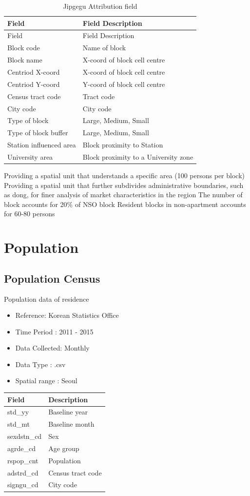 \documentclass[]{book}
\providecommand{\tightlist}{%
  \setlength{\itemsep}{0pt}\setlength{\parskip}{0pt}}
\theoremstyle{definition}
\theoremstyle{definition}
\theoremstyle{definition}
\theoremstyle{remark}
\begin{document}
\begin{longtable}[]{@{}ll@{}}
\caption{\label{tab:foo} Jipgegu Attribution field}\tabularnewline
\toprule
Field & Field Description\tabularnewline
\midrule
\endfirsthead
\toprule
Field & Field Description\tabularnewline
\midrule
\endhead
Block code & Name of block\tabularnewline
Block name & X-coord of block cell centre\tabularnewline
Centriod X-coord & X-coord of block cell centre\tabularnewline
Centriod Y-coord & Y-coord of block cell centre\tabularnewline
Census tract code & Tract code\tabularnewline
City code & City code\tabularnewline
Type of block & Large, Medium, Small\tabularnewline
Type of block buffer & Large, Medium, Small\tabularnewline
Station influenced area & Block proximity to Station\tabularnewline
University area & Block proximity to a University zone\tabularnewline
\bottomrule
\end{longtable}

Providing a spatial unit that understands a specific area (100 persons
per block) Providing a spatial unit that further subdivides
administrative boundaries, such as dong, for finer analysis of market
characteristics in the region The number of block accounts for 20\% of
NSO block Resident blocks in non-apartment accounts for 60-80 persons

\chapter{Population}\label{population}

\section{Population Census}\label{population-census}

Population data of residence

\begin{itemize}
\tightlist
\item
  Reference: Korean Statistics Office
\item
  Time Period : 2011 - 2015
\item
  Data Collected: Monthly
\item
  Data Type : .csv
\item
  Spatial range : Seoul 
\end{itemize}

\begin{longtable}[]{@{}ll@{}}
\toprule
Field & Description\tabularnewline
\midrule
\endhead
std\_yy & Baseline year\tabularnewline
std\_mt & Baseline month\tabularnewline
sexdstn\_cd & Sex\tabularnewline
agrde\_cd & Age group\tabularnewline
rspop\_cnt & Population\tabularnewline
adstrd\_cd & Census tract code\tabularnewline
signgu\_cd & City code\tabularnewline
\bottomrule
\end{longtable}
\end{document}
